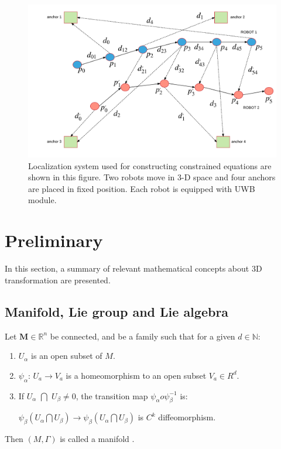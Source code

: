 \documentclass[journal]{IEEEtran}
\begin{document}


\begin{figure}[!t]
\centering
\includegraphics[width=0.7\linewidth]{pic/uwb.pdf}
\caption{Localization system used for constructing constrained equations are shown in this figure. Two robots move in 3-D space and four anchors are placed in fixed position. Each robot is equipped with UWB module.}
\label{fig2}
\end{figure}

\section{Preliminary}
\label{sec:preliminary}

In this section, a summary of relevant mathematical concepts about 3D transformation are presented.

\subsection{Manifold, Lie group and Lie algebra}
\label{sec:2}

Let $\mathbf{M} \in \mathbb{R}^{n} $ be connected, and  be a family such that for a given $d \in \mathbb{N}$: 
\begin{enumerate}
	\item $U_\alpha$ is an open subset of $M$.
	\item $\psi_\alpha$: $U_a \rightarrow V_a$ is a homeomorphism to an open subset $V_a \in R^{d}$.
	\item  If $U_\alpha$ $\bigcap$ $U_\beta \neq 0$, the transition map $\psi_\alpha o \psi_\beta^{-1}$ is:
	
	$\psi_\beta(U_\alpha \bigcap U_\beta) \rightarrow \psi_\beta(U_\alpha \bigcap U_\beta)$ is $C^{k}$ diffeomorphism.
\end{enumerate}
Then $(M,\Gamma)$ is called a manifold \cite{Hertzberg:2008tx}.
\end{document}
